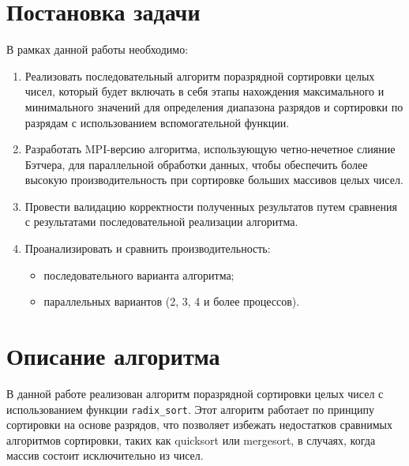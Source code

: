 \documentclass[12pt]{article}
\begin{document}
\section{Постановка задачи}

В рамках данной работы необходимо:

\begin{enumerate}

    \item Реализовать последовательный алгоритм поразрядной сортировки целых чисел, который будет включать в себя этапы нахождения максимального и минимального значений для определения диапазона разрядов и сортировки по разрядам с использованием вспомогательной функции.

    \item Разработать MPI-версию алгоритма, использующую четно-нечетное слияние Бэтчера, для параллельной обработки данных, чтобы обеспечить более высокую производительность при сортировке больших массивов целых чисел.

    \item Провести валидацию корректности полученных результатов путем сравнения с результатами последовательной реализации алгоритма.

    \item Проанализировать и сравнить производительность:

        \begin{itemize}

            \item последовательного варианта алгоритма;

            \item параллельных вариантов (2, 3, 4 и более процессов).

        \end{itemize}

\end{enumerate}

\section{Описание алгоритма}

В данной работе реализован алгоритм поразрядной сортировки целых чисел с использованием функции \texttt{radix\_sort}. Этот алгоритм работает по принципу сортировки на основе разрядов, что позволяет избежать недостатков сравнимых алгоритмов сортировки, таких как quicksort или mergesort, в случаях, когда массив состоит исключительно из чисел. 
\end{document}
